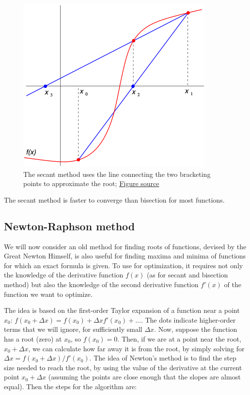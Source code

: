 \documentclass[
  letterpaper,
  DIV=11,
  numbers=noendperiod]{scrreprt}
\begin{document}
\begin{figure}[H]

{\centering \includegraphics{figs/Secant_method.png}

}

\caption{The secant method uses the line connecting the two bracketing
points to approximate the root;
\href{https://commons.wikimedia.org/w/index.php?curid=877497}{Figure
source}}

\end{figure}%

The secant method is faster to converge than bisection for most
functions.

\subsection{Newton-Raphson method}\label{newton-raphson-method}

We will now consider an old method for finding roots of functions,
devised by the Great Newton Himself, is also useful for finding maxima
and minima of functions for which an exact formula is given. To use for
optimization, it requires not only the knowledge of the derivative
function \(f(x)\) (as for secant and bisection method) but also the
knowledge of the second derivative function \(f'(x)\) of the function we
want to optimize.

The idea is based on the first-order Taylor expansion of a function near
a point \(x_0\):
\(f(x_0 + \Delta x) = f(x_0) + \Delta x f'(x_0) + ...\). The dots
indicate higher-order terms that we will ignore, for sufficiently small
\(\Delta x\). Now, suppose the function has a root (zero) at \(x_0\), so
\(f(x_0) = 0\). Then, if we are at a point near the root,
\(x_0 + \Delta x\), we can calculate how far away it is from the root,
by simply solving for \(\Delta x  = f(x_0 + \Delta x) /  f'(x_0)\). The
idea of Newton's method is to find the step size needed to reach the
root, by using the value of the derivative at the current point
\(x_0 + \Delta x\) (assuming the points are close enough that the slopes
are almost equal). Then the steps for the algorithm are:
\end{document}
